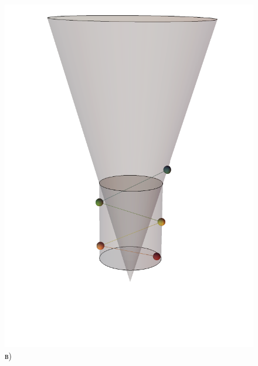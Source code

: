 \documentclass[
11pt,
master, %
subf, %
href, %
colorlinks=true, %
]{disser}
\begin{document}
\begin{figure}[h!]
\begin{minipage}[h]{0.48\linewidth}
		\includegraphics[width=1\linewidth]{vis3} \\ в)
	\end{minipage}
	\hfill
	\begin{minipage}[h]{0.4\linewidth}
		\centering

\end{minipage}
\end{figure}
\end{document}
